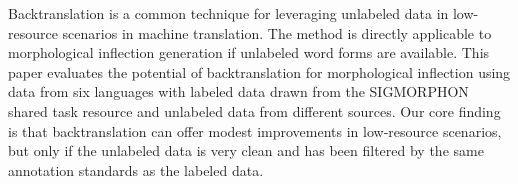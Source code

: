 Backtranslation is a common technique for leveraging unlabeled data in low-resource scenarios in machine translation. The method is directly applicable to morphological inflection generation if unlabeled word forms are available. This paper evaluates the potential of backtranslation for morphological inflection using data from six languages with labeled data drawn from the SIGMORPHON shared task resource and unlabeled data from different sources. Our core finding is that backtranslation can offer modest improvements in low-resource scenarios, but only if the unlabeled data is very clean and has been filtered by the same annotation standards as the labeled data.
